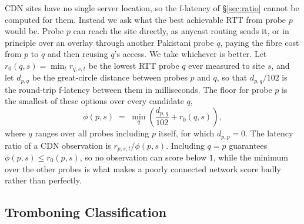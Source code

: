 \documentclass[sigconf,anonymous,10pt]{acmart}
\begin{document}
CDN sites have no single server location, so the f-latency of \S\ref{sec:ratio} cannot be computed for them. Instead we ask what the best achievable RTT from probe $p$ would be. Probe $p$ can reach the site directly, as anycast routing sends it, or in principle over an overlay through another Pakistani probe $q$, paying the fibre cost from $p$ to $q$ and then reusing $q$'s access. We take whichever is better. Let $r_0(q,s) = \min_t r_{q,s,t}$ be the lowest RTT probe $q$ ever measured to site $s$, and let $d_{p,q}$ be the great-circle distance between probes $p$ and $q$, so that $d_{p,q}/102$ is the round-trip f-latency between them in milliseconds. The floor for probe $p$ is the smallest of these options over every candidate $q$,
\[
  \phi(p,s) \;=\; \min_{q}\left(\frac{d_{p,q}}{102} + r_0(q,s)\right),
\]
where $q$ ranges over all probes including $p$ itself, for which $d_{p,p} = 0$. The latency ratio of a CDN observation is $r_{p,s,t}/\phi(p,s)$. Including $q=p$ guarantees $\phi(p,s) \le r_0(p,s)$, so no observation can score below $1$, while the minimum over the other probes is what makes a poorly connected network score badly rather than perfectly.

   

\subsection{Tromboning Classification}
\label{sec:detector}
\end{document}

